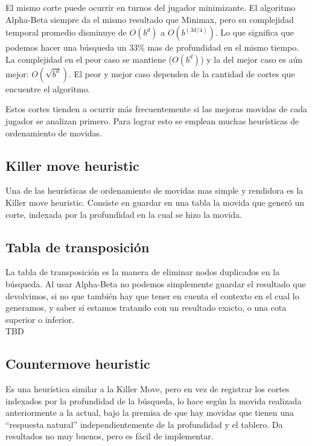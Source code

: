 \documentclass{article}
\begin{document}
El mismo corte puede ocurrir en turnos del jugador minimizante. El
algoritmo Alpha-Beta siempre da el mismo resultado que Minimax,
pero su complejidad temporal promedio disminuye de $O(b^d)$ a
$O(b^{(3d/4)})$\footnotemark. Lo que significa que podemos hacer una
búsqueda un 33\% mas de profundidad en el mismo tiempo. La complejidad
en el peor caso se mantiene ($O(b^d)$) y la del mejor caso es aún
mejor: $O(\sqrt{b^d})$. El peor y mejor caso dependen de la cantidad de
cortes que encuentre el algoritmo.
\\


Estos cortes tienden a ocurrir más frecuentemente si las mejoras
movidas de cada jugador se analizan primero. Para lograr esto se emplean
muchas heurísticas de ordenamiento de movidas.
\\

\subsection{Killer move heuristic}
Una de las heurísticas de ordenamiento de movidas mas simple y
rendidora es la Killer move heuristic. Consiste en guardar en una tabla
la movida que generó un corte, indexada por la profundidad en la cual
se hizo la movida.
\\

\subsection{Tabla de transposición}
La tabla de transposición es la manera de eliminar nodos duplicados
en la búsqueda. Al usar Alpha-Beta no podemos simplemente guardar el
resultado que devolvimos, si no que también hay que tener en cuenta el
contexto en el cual lo generamos, y saber si estamos tratando con un
resultado exacto, o una cota superior o inferior.
\\

TBD
\\

\subsection{Countermove heuristic}
Es una heurística similar a la Killer Move, pero en vez de registrar
los cortes indexados por la profundidad de la búsqueda, lo hace según
la movida realizada anteriormente a la actual, bajo la premisa de que
hay movidas que tienen una ``respuesta natural'' independientemente de
la profundidad y el tablero. Da resultados no muy buenos, pero es fácil
de implementar.
\\
\end{document}
